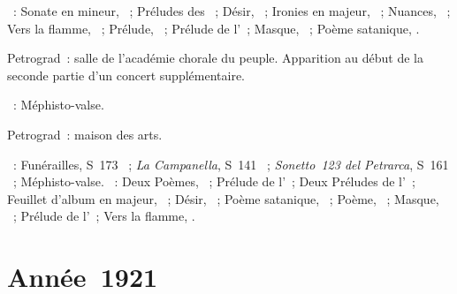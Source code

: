\begin{description}
 \textsc{\Scriabine{}}~: Sonate en \kF \Sharp mineur, ~; Préludes
 des ~; Désir,  ~; Ironies en \kC majeur,
  ~; Nuances,  ~; Vers la flamme,
 ~; Prélude,  ~; Prélude de l'~;
 Masque,  ~; Poème satanique, .
 \item[\DateWithWeekDay{1920-12-19}]
 Petrograd~: salle de l'académie chorale du peuple.
 Apparition au début de la seconde partie d'un concert supplémentaire.

 \textsc{\Liszt{}}~: Méphisto-valse.
 \item[\DateWithWeekDay{1920-12-31}]
 Petrograd~: maison des arts.

 \textsc{\Liszt{}}~: Funérailles, S~173 ~; \emph{La Campanella},
 S~141 ~; \emph{Sonetto~123 del Petrarca}, S~161 ~;
 Méphisto-valse.
 \textsc{\Scriabine{}}~: Deux Poèmes, ~; Prélude de l'~;
 Deux Préludes de l'~; Feuillet d'album en \kE \Flat majeur,
  ~; Désir,  ~; Poème satanique,
 ~; Poème,  ~; Masque,  ~;
 Prélude de l'~; Vers la flamme, .
\end{description}

\section{Année~1921}

